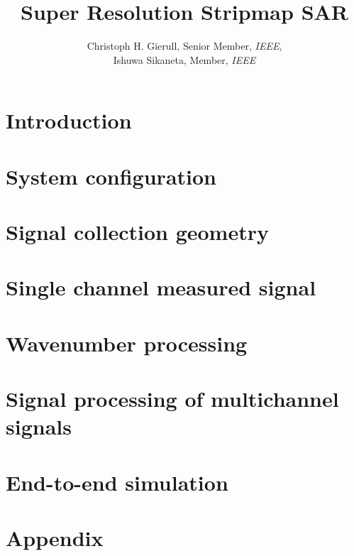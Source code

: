 \documentclass[10pt,oneside]{book}
\title{Super Resolution Stripmap SAR}
\author{Christoph H. Gierull, Senior Member, \textsl{IEEE},\\ Ishuwa Sikaneta, Member, \textsl{IEEE}}
\begin{document}
\maketitle
\tableofcontents
\chapter{Introduction}


\chapter{System configuration}


\chapter{Signal collection geometry}






\chapter{Single channel measured signal}


\chapter{Wavenumber processing}



\chapter{Signal processing of multichannel signals}


\chapter{End-to-end simulation}



\printbibliography
\appendix
\chapter{Appendix}







\end{document}

